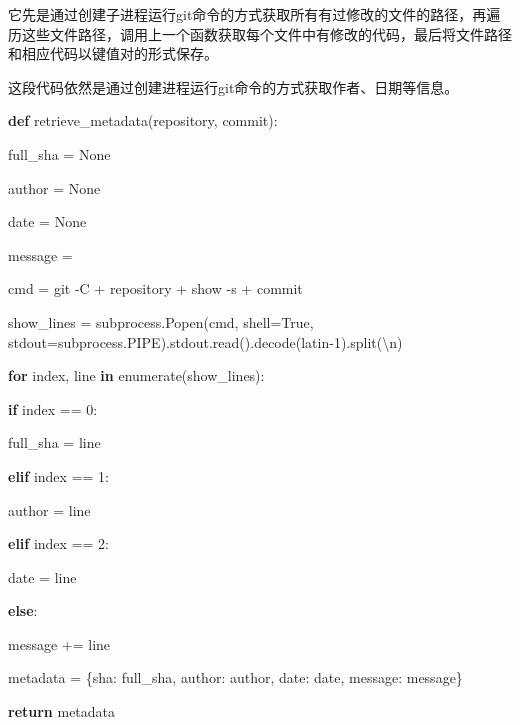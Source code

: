 \documentclass[
]{article}
\newenvironment{Shaded}{}{}
\newcommand{\BuiltInTok}[1]{\textcolor[rgb]{0.00,0.50,0.00}{#1}}
\newcommand{\CharTok}[1]{\textcolor[rgb]{0.25,0.44,0.63}{#1}}
\newcommand{\ControlFlowTok}[1]{\textcolor[rgb]{0.00,0.44,0.13}{\textbf{#1}}}
\newcommand{\DecValTok}[1]{\textcolor[rgb]{0.25,0.63,0.44}{#1}}
\newcommand{\KeywordTok}[1]{\textcolor[rgb]{0.00,0.44,0.13}{\textbf{#1}}}
\newcommand{\NormalTok}[1]{#1}
\newcommand{\OperatorTok}[1]{\textcolor[rgb]{0.40,0.40,0.40}{#1}}
\newcommand{\StringTok}[1]{\textcolor[rgb]{0.25,0.44,0.63}{#1}}
\newcommand{\VariableTok}[1]{\textcolor[rgb]{0.10,0.09,0.49}{#1}}
\begin{document}
它先是通过创建子进程运行git命令的方式获取所有有过修改的文件的路径，再遍历这些文件路径，调用上一个函数获取每个文件中有修改的代码，最后将文件路径和相应代码以键值对的形式保存。

这段代码依然是通过创建进程运行git命令的方式获取作者、日期等信息。

\begin{Shaded}
  \begin{Highlighting}[]
    \KeywordTok{def}\NormalTok{ retrieve\_metadata(repository, commit):
    }
    \NormalTok{    full\_sha }\OperatorTok{=}\NormalTok{ None
    }
    \NormalTok{    author }\OperatorTok{=}\NormalTok{ None
    }
    \NormalTok{    date }\OperatorTok{=}\NormalTok{ None
    }
    \NormalTok{    message }\OperatorTok{=} \StringTok{\textquotesingle{}\textquotesingle{}}

    \NormalTok{    cmd }\OperatorTok{=} \StringTok{\textquotesingle{}git {-}C \textquotesingle{}} \OperatorTok{+}\NormalTok{ repository }\OperatorTok{+} \StringTok{\textquotesingle{} show {-}s \textquotesingle{}} \OperatorTok{+}\NormalTok{ commit
    }
    \NormalTok{    show\_lines }\OperatorTok{=}\NormalTok{ subprocess.Popen(cmd, shell}\OperatorTok{=}\VariableTok{True}\NormalTok{, stdout}\OperatorTok{=}\NormalTok{subprocess.PIPE).stdout.read().decode(}\StringTok{\textquotesingle{}latin{-}1\textquotesingle{}}\NormalTok{).split(}\StringTok{\textquotesingle{}}\CharTok{\textbackslash{}n}\StringTok{\textquotesingle{}}\NormalTok{)
    }
    \ControlFlowTok{for}\NormalTok{ index, line }\KeywordTok{in} \BuiltInTok{enumerate}\NormalTok{(show\_lines):
    }
    \ControlFlowTok{if}\NormalTok{ index }\OperatorTok{==} \DecValTok{0}\NormalTok{:
    }
    \NormalTok{            full\_sha }\OperatorTok{=}\NormalTok{ line
    }
    \ControlFlowTok{elif}\NormalTok{ index }\OperatorTok{==} \DecValTok{1}\NormalTok{:
    }
    \NormalTok{            author }\OperatorTok{=}\NormalTok{ line
    }
    \ControlFlowTok{elif}\NormalTok{ index }\OperatorTok{==} \DecValTok{2}\NormalTok{:
    }
    \NormalTok{            date }\OperatorTok{=}\NormalTok{ line
    }
    \ControlFlowTok{else}\NormalTok{:
    }
    \NormalTok{            message }\OperatorTok{+=}\NormalTok{ line
    }
    \NormalTok{    metadata }\OperatorTok{=}\NormalTok{ \{}\StringTok{\textquotesingle{}sha\textquotesingle{}}\NormalTok{: full\_sha, }\StringTok{\textquotesingle{}author\textquotesingle{}}\NormalTok{: author, }\StringTok{\textquotesingle{}date\textquotesingle{}}\NormalTok{: date, }\StringTok{\textquotesingle{}message\textquotesingle{}}\NormalTok{: message\}
    }
    \ControlFlowTok{return}\NormalTok{ metadata}
  \end{Highlighting}
\end{Shaded}
\end{document}
